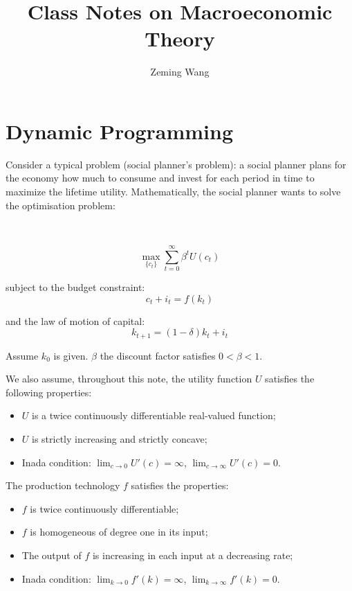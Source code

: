 \documentclass[10pt,a4]{article}
\title{Class Notes on Macroeconomic Theory}
\author[1]{Zeming Wang}%
\affil[1]{Australian National University}%
\date{}
\begin{document}
\maketitle
 
\tableofcontents


\newpage






\section{Dynamic Programming}

{\label{895037}}

Consider a typical problem (social planner's problem): a social planner
plans for the economy how much to consume and invest for each period in
time to maximize the lifetime utility. Mathematically, the social
planner wants to solve the optimisation problem:

~

$$ \max_{\{c_t\}} \sum_{t=0}^{\infty} \beta^t U(c_t) $$

subject to the budget constraint:
$$ c_t + i_t = f(k_t) $$

and the law of motion of capital:
$$ k_{t+1} = (1-\delta)k_t + i_t $$



Assume $k_0$ is given. $\beta$ the discount factor satisfies $0<\beta<1$. 

We also assume, throughout this note, the utility function $U$ satisfies the following properties:
\begin{itemize}
\item $U$ is a twice continuously differentiable real-valued function;
\item $U$ is strictly increasing and strictly concave;
\item Inada condition: $\lim_{c\to 0} U'(c) = \infty$, $\lim_{c\to\infty} U'(c)=0$.
\end{itemize}

The production technology $f$ satisfies the properties:
\begin{itemize}
\item $f$ is twice continuously differentiable;
\item $f$ is homogeneous of degree one in its input;
\item The output of $f$ is increasing in each input at a decreasing rate;
\item Inada condition: $\lim_{k\to 0} f'(k) = \infty$, $\lim_{k\to\infty} f'(k)=0$.
\end{itemize}
\end{document}
